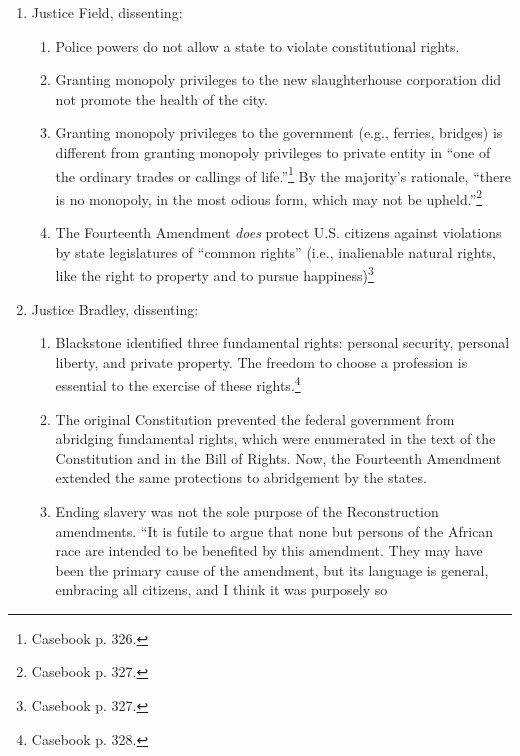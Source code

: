 \begin{enumerate}
\begin{enumerate}
\begin{enumerate}
            slavery.\footnote{Casebook p. 326.}
        \end{enumerate}
    \end{enumerate}
    \item Justice Field, dissenting:
    \begin{enumerate}
        \item Police powers do not allow a state to violate constitutional 
        rights.
        \item Granting monopoly privileges to the new slaughterhouse 
        corporation did not promote the health of the city.
        \item Granting monopoly privileges to the government (e.g., ferries, 
        bridges) is different from granting monopoly privileges to private 
        entity in ``one of the ordinary trades or callings of 
        life.''\footnote{Casebook p. 326.} By the majority's rationale, 
        ``there is no monopoly, in the most odious form, which may not be 
        upheld.''\footnote{Casebook p. 327.}
        \item The Fourteenth Amendment \emph{does} protect U.S. citizens 
        against violations by state legislatures of ``common 
        rights'' (i.e., inalienable natural rights, like the right to property 
        and to pursue happiness)\footnote{Casebook p. 327.}
    \end{enumerate}
    \item Justice Bradley, dissenting:
    \begin{enumerate}
        \item Blackstone identified three fundamental rights: personal 
        security, personal liberty, and private property. The freedom to choose a 
        profession is essential to the exercise of these 
        rights.\footnote{Casebook p. 328.}
        \item The original Constitution prevented the federal government from 
        abridging fundamental rights, which were enumerated in the text of the 
        Constitution and in the Bill of Rights. Now, the Fourteenth Amendment 
        extended the same protections to abridgement by the states.
        \item Ending slavery was not the sole purpose of the Reconstruction 
        amendments. ``It is futile to argue that none but persons of the 
        African race are intended to be benefited by this amendment. They may 
        have been the primary cause of the amendment, but its language is 
        general, embracing all citizens, and I think it was purposely so 

\end{enumerate}
\end{enumerate}
